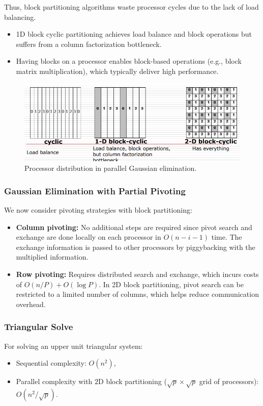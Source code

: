 \documentclass[12pt]{book}
\begin{document}
Thus, block partitioning algorithms waste processor cycles due to the lack of load balancing.  
\begin{itemize}
    \item 1D block cyclic partitioning achieves load balance and block operations but suffers from a column factorization bottleneck.  
    \item Having blocks on a processor enables block-based operations (e.g., block matrix multiplication), which typically deliver high performance.
\end{itemize}

\begin{figure}[H]
    \centering
    \includegraphics[width=0.5\linewidth]{images/GEdistr.png}
    \caption{Processor distribution in parallel Gaussian elimination.}
\end{figure}


\subsubsection{Gaussian Elimination with Partial Pivoting}
We now consider pivoting strategies with block partitioning:
\begin{itemize}
    \item \textbf{Column pivoting:} No additional steps are required since pivot search and exchange are done locally on each processor in $O(n-i-1)$ time. The exchange information is passed to other processors by piggybacking with the multiplied information.
    \item \textbf{Row pivoting:} Requires distributed search and exchange, which incurs costs of $O(n/P) + O(\log P)$. In 2D block partitioning, pivot search can be restricted to a limited number of columns, which helps reduce communication overhead.
\end{itemize}

\subsubsection{Triangular Solve}
For solving an upper unit triangular system:
\begin{itemize}
    \item Sequential complexity: $O(n^2)$,
    \item Parallel complexity with $2$D block partitioning ($\sqrt{p} \times \sqrt{p}$ grid of processors): $O(n^2/\sqrt{p})$.
\end{itemize}
\end{document}

